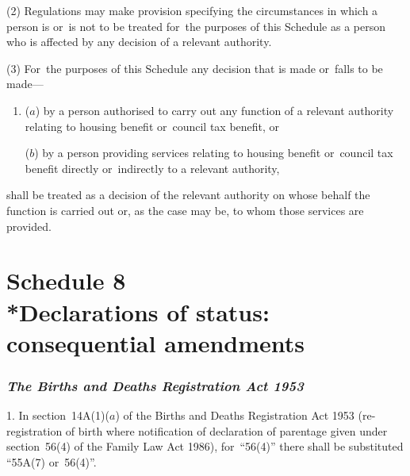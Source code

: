 \documentclass[12pt,a4paper]{article}
\begin{document}
(2) Regulations may make provision specifying the circumstances in which a person is or~is not to be treated for~the purposes of this Schedule as a person who is affected by any decision of a relevant authority.

(3) For~the purposes of this Schedule any decision that is made or~falls to be made—
\begin{enumerate}\item[]
($a$) by a person authorised to carry out any function of a relevant authority relating to housing benefit or~council tax benefit, or

($b$) by a person providing services relating to housing benefit or~council tax benefit directly or~indirectly to a relevant authority,
\end{enumerate}
shall be treated as a decision of the relevant authority on whose behalf the function is carried out or, as the case may be, to whom those services are provided. 


\part[Schedule 8 --- Declarations of status: consequential amendments]{Schedule 8\\*Declarations of status: consequential amendments}

\renewcommand\parthead{--- Schedule 8}

\section*{\itshape The Births and Deaths Registration Act 1953}

1. In section~14A(1)($a$)  of the Births and Deaths Registration Act 1953 (re-registration of birth where notification of declaration of parentage given under section~56(4)  of the Family Law Act 1986), for~“56(4)” there shall be substituted “55A(7)  or~56(4)”.

%
%
%
\end{document}
